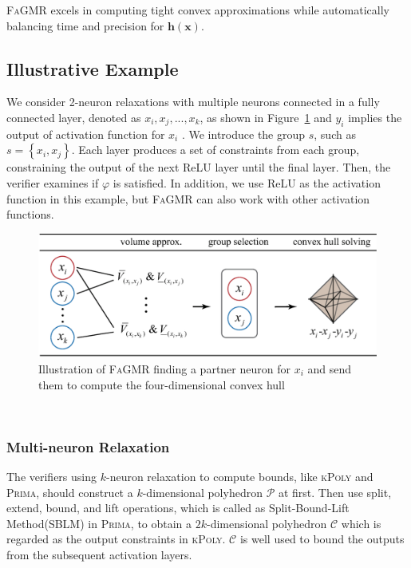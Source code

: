 \documentclass[runningheads]{llncs}
\newcommand{\ourtool}{\textsc{FaGMR}\xspace}
\newcommand{\prima}{\textsc{Prima}\xspace}
\newcommand{\krelu}{\textsc{kPoly}\xspace}
\newcommand{\myvec}[1]{\boldsymbol{#1}}
\newcommand{\relu}{ReLU\xspace}
\begin{document}
\ourtool excels in computing tight convex approximations while automatically balancing time and precision for $\myvec{h}(\myvec{x})$.

%
%
%
\subsection{Illustrative Example}\label{illustrative example}
We consider 2-neuron relaxations with multiple neurons connected in a fully connected layer, denoted as $x_{i},x_{j},...,x_{k}$, as shown in Figure~\ref{FigR1_0} and $y_{i}$ implies the output of activation function for $x_{i}$ . We introduce the group $s$, such as $s = \left\{x_{i},x_{j}\right\}$. Each layer produces a set of constraints from each group, constraining the output of the next \relu layer until the final layer. Then, the verifier examines if $\varphi$ is satisfied. In addition, we use \relu as the activation function in this example, but \ourtool can also work with other activation functions. 
%
%
%
\begin{figure}[ht]
	\vskip 0.2in
	\begin{center}
	\includegraphics[width=\linewidth]{figures/workflow.eps}
	\caption{Illustration of \ourtool finding a partner neuron for $x_{i}$ and send them
	to compute the four-dimensional convex hull}
	\label{FigR1_0}
	\end{center}
	\vskip -0.2in
\end{figure}\\
\subsubsection{Multi-neuron Relaxation}
The verifiers using $k$-neuron relaxation to compute bounds, like \krelu and \prima, should construct a $k$-dimensional polyhedron $\mathcal{P}$ at first. Then use split, extend, bound, and lift operations, which is called as Split-Bound-Lift Method(SBLM) in \prima, to obtain a $2k$-dimensional polyhedron $\mathcal{C}$ which is regarded as the output constraints in \krelu. $\mathcal{C}$ is well used to bound the outputs from the subsequent activation layers.
\end{document}
